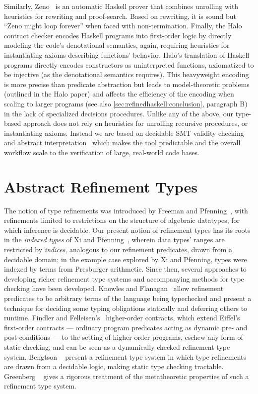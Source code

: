%
Similarly, Zeno~\cite{ZENO} is an automatic Haskell 
prover that combines unrolling with heuristics for rewriting
and proof-search. 
Based on rewriting, it is sound but 
``Zeno might loop forever'' when faced with 
non-termination.
%
Finally, the Halo~\cite{halo} contract checker encodes 
Haskell programs into first-order logic by directly 
modeling the code's denotational semantics,
again, requiring heuristics for instantiating axioms 
describing functions' behavior. Halo's translation of Haskell
programs directly encodes constructors as uninterpreted functions,
axiomatized to be injective (as the denotational semantics requires).
This heavyweight encoding is more precise than predicate abstraction 
but leads to model-theoretic problems (outlined in the Halo paper) and 
affects the efficiency of the encoding when scaling to larger programs 
(see also \ref{sec:refinedhaskell:conclusion}, paragraph B) in the lack of specialized 
decisions procedures.
%
Unlike any of the above, our type-based approach does 
not rely on heuristics for unrolling recursive procedures, 
or instantiating axioms. 
%
Instead we are based on decidable SMT validity 
checking and abstract interpretation~\cite{LiquidPLDI08} 
which makes the tool predictable and the overall workflow
scale to the verification of large, real-world
code bases.

\section{Abstract Refinement Types}\label{sec:related}

The notion of type refinements was introduced by Freeman and
Pfenning~\cite{FreemanPfenning91}, with refinements limited to
restrictions on the structure of algebraic datatypes, for which
inference is decidable.
%
Our present notion of refinement types has its roots in the
\emph{indexed types} of Xi and Pfenning~\cite{pfenningxi98}, wherein
data types' ranges are restricted by \emph{indices}, analogous to our
refinement predicates, drawn from a decidable domain; in the example
case explored by Xi and Pfenning, types were indexed by terms from
Presburger arithmetic.
%
Since then, several approaches to developing richer refinement type
systems and accompanying methods for type checking have been
developed.
%
Knowles and Flanagan~\cite{Knowles10} allow refinement predicates to
be arbitrary terms of the language being typechecked and present a
technique for deciding some typing obligations statically and
deferring others to runtime.
%
Findler and Felleisen's~\cite{Findler02} higher-order contracts, which
extend Eiffel's~\cite{MeyerBook} first-order contracts --- ordinary
program predicates acting as dynamic pre- and post-conditions --- to
the setting of higher-order programs, eschew any form of static
checking, and can be seen as a dynamically-checked refinement type
system.
%
Bengtson \etal~\cite{GordonTOPLAS2011} present a refinement type
system in which type refinements are drawn from a decidable logic,
making static type checking tractable.
%
Greenberg \etal~\cite{Greenberg11} gives a rigorous treatment of the
metatheoretic properties of such a refinement type system.

